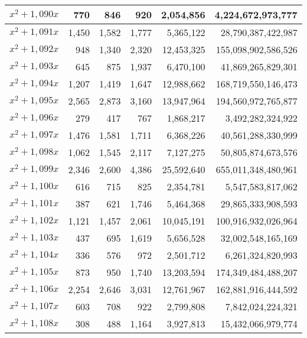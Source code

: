 \documentclass[a4paper]{amsproc}
\theoremstyle{plain}
\theoremstyle{named}
\begin{document}
\begin{longtable}{ | l | r | r | r | r | r | }
$x^2 + 1{,}090x$ & 770 & 846 & 920 & 2{,}054{,}856 & 4{,}224{,}672{,}973{,}777 \\ \hline
$x^2 + 1{,}091x$ & 1{,}450 & 1{,}582 & 1{,}777 & 5{,}365{,}122 & 28{,}790{,}387{,}422{,}987 \\ \hline
$x^2 + 1{,}092x$ & 948 & 1{,}340 & 2{,}320 & 12{,}453{,}325 & 155{,}098{,}902{,}586{,}526 \\ \hline
$x^2 + 1{,}093x$ & 645 & 875 & 1{,}937 & 6{,}470{,}100 & 41{,}869{,}265{,}829{,}301 \\ \hline
$x^2 + 1{,}094x$ & 1{,}207 & 1{,}419 & 1{,}647 & 12{,}988{,}662 & 168{,}719{,}550{,}146{,}473 \\ \hline
$x^2 + 1{,}095x$ & 2{,}565 & 2{,}873 & 3{,}160 & 13{,}947{,}964 & 194{,}560{,}972{,}765{,}877 \\ \hline
$x^2 + 1{,}096x$ & 279 & 417 & 767 & 1{,}868{,}217 & 3{,}492{,}282{,}324{,}922 \\ \hline
$x^2 + 1{,}097x$ & 1{,}476 & 1{,}581 & 1{,}711 & 6{,}368{,}226 & 40{,}561{,}288{,}330{,}999 \\ \hline
$x^2 + 1{,}098x$ & 1{,}062 & 1{,}545 & 2{,}117 & 7{,}127{,}275 & 50{,}805{,}874{,}673{,}576 \\ \hline
$x^2 + 1{,}099x$ & 2{,}346 & 2{,}600 & 4{,}386 & 25{,}592{,}640 & 655{,}011{,}348{,}480{,}961 \\ \hline
$x^2 + 1{,}100x$ & 616 & 715 & 825 & 2{,}354{,}781 & 5{,}547{,}583{,}817{,}062 \\ \hline
$x^2 + 1{,}101x$ & 387 & 621 & 1{,}746 & 5{,}464{,}368 & 29{,}865{,}333{,}908{,}593 \\ \hline
$x^2 + 1{,}102x$ & 1{,}121 & 1{,}457 & 2{,}061 & 10{,}045{,}191 & 100{,}916{,}932{,}026{,}964 \\ \hline
$x^2 + 1{,}103x$ & 437 & 695 & 1{,}619 & 5{,}656{,}528 & 32{,}002{,}548{,}165{,}169 \\ \hline
$x^2 + 1{,}104x$ & 336 & 576 & 972 & 2{,}501{,}712 & 6{,}261{,}324{,}820{,}993 \\ \hline
$x^2 + 1{,}105x$ & 873 & 950 & 1{,}740 & 13{,}203{,}594 & 174{,}349{,}484{,}488{,}207 \\ \hline
$x^2 + 1{,}106x$ & 2{,}254 & 2{,}646 & 3{,}031 & 12{,}761{,}967 & 162{,}881{,}916{,}444{,}592 \\ \hline
$x^2 + 1{,}107x$ & 603 & 708 & 922 & 2{,}799{,}808 & 7{,}842{,}024{,}224{,}321 \\ \hline
$x^2 + 1{,}108x$ & 308 & 488 & 1{,}164 & 3{,}927{,}813 & 15{,}432{,}066{,}979{,}774 \\ \hline

\end{longtable}
\end{document}
